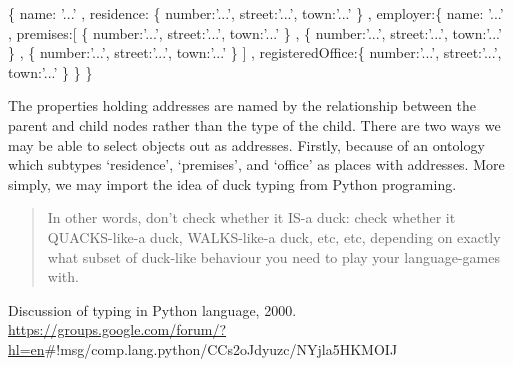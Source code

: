 \documentclass[]{article}
\newenvironment{Shaded}{}{}
\newcommand{\DataTypeTok}[1]{\textcolor[rgb]{0.56,0.13,0.00}{{#1}}}
\newcommand{\StringTok}[1]{\textcolor[rgb]{0.25,0.44,0.63}{{#1}}}
\newcommand{\NormalTok}[1]{{#1}}
\begin{document}
\begin{Shaded}
\begin{Highlighting}[]
\NormalTok{\{}
   \DataTypeTok{name}\NormalTok{: }\StringTok{'...'}
\NormalTok{,  }\DataTypeTok{residence}\NormalTok{: \{}
      \DataTypeTok{number}\NormalTok{:}\StringTok{'...'}\NormalTok{, }\DataTypeTok{street}\NormalTok{:}\StringTok{'...'}\NormalTok{, }\DataTypeTok{town}\NormalTok{:}\StringTok{'...'} 
   \NormalTok{\}}
\NormalTok{,  }\DataTypeTok{employer}\NormalTok{:\{}
      \DataTypeTok{name}\NormalTok{: }\StringTok{'...'}
   \NormalTok{,  }\DataTypeTok{premises}\NormalTok{:[}
         \NormalTok{\{ }\DataTypeTok{number}\NormalTok{:}\StringTok{'...'}\NormalTok{, }\DataTypeTok{street}\NormalTok{:}\StringTok{'...'}\NormalTok{, }\DataTypeTok{town}\NormalTok{:}\StringTok{'...'} \NormalTok{\}}
      \NormalTok{,  \{ }\DataTypeTok{number}\NormalTok{:}\StringTok{'...'}\NormalTok{, }\DataTypeTok{street}\NormalTok{:}\StringTok{'...'}\NormalTok{, }\DataTypeTok{town}\NormalTok{:}\StringTok{'...'} \NormalTok{\}}
      \NormalTok{,  \{ }\DataTypeTok{number}\NormalTok{:}\StringTok{'...'}\NormalTok{, }\DataTypeTok{street}\NormalTok{:}\StringTok{'...'}\NormalTok{, }\DataTypeTok{town}\NormalTok{:}\StringTok{'...'} \NormalTok{\}}
      \NormalTok{]}
   \NormalTok{,  }\DataTypeTok{registeredOffice}\NormalTok{:\{}
         \DataTypeTok{number}\NormalTok{:}\StringTok{'...'}\NormalTok{, }\DataTypeTok{street}\NormalTok{:}\StringTok{'...'}\NormalTok{, }\DataTypeTok{town}\NormalTok{:}\StringTok{'...'}
      \NormalTok{\}}
   \NormalTok{\}}
\NormalTok{\}  }
\end{Highlighting}
\end{Shaded}

The properties holding addresses are named by the relationship between
the parent and child nodes rather than the type of the child. There are
two ways we may be able to select objects out as addresses. Firstly,
because of an ontology which subtypes `residence', `premises', and
`office' as places with addresses. More simply, we may import the idea
of duck typing from Python programing.

\begin{quote}
In other words, don't check whether it IS-a duck: check whether it
QUACKS-like-a duck, WALKS-like-a duck, etc, etc, depending on exactly
what subset of duck-like behaviour you need to play your language-games
with.
\end{quote}

Discussion of typing in Python language, 2000.
\url{https://groups.google.com/forum/?hl=en}\#!msg/comp.lang.python/CCs2oJdyuzc/NYjla5HKMOIJ
\end{document}

